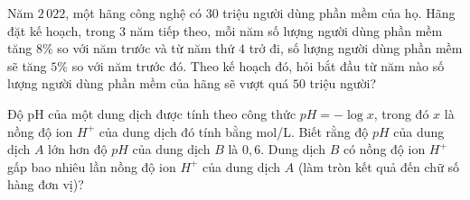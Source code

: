 \begin{ex}%
	Năm $2\,022$, một hãng công nghệ có $30$ triệu người dùng phần mềm của họ. Hãng đặt kế hoạch, trong $3$ năm tiếp theo, mỗi năm số lượng người dùng phần mềm tăng $8\%$ so với năm trước và từ năm thứ $4$ trở đi, số lượng người dùng phần mềm sẽ tăng $5\%$ so với năm trước đó. Theo kế hoạch đó, hỏi bắt đầu từ năm nào số lượng người dùng phần mềm của hãng sẽ vượt quá $50$ triệu người?
\end{ex}

\begin{ex}%
	Độ pH của một dung dịch được tính theo công thức $pH=-\log x$,  trong đó $x$ 
	là nồng độ ion $H^+$ của dung dịch đó tính bằng mol/L. Biết rằng độ $pH$ của dung dịch $A$ lớn hơn độ $pH$ của dung dịch $B$ là $0{,}6$. Dung dịch $B$ có nồng độ ion $H^+$ gấp bao nhiêu lần nồng độ ion $H^+$ của dung dịch $A$ (làm tròn kết quả đến chữ số hàng đơn vị)?
	\par {}
\end{ex}

